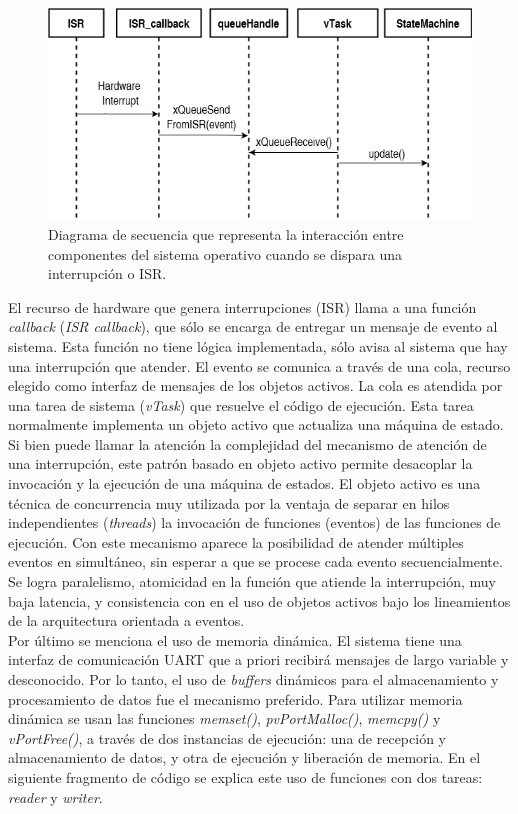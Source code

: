 \begin{figure}[ht]
	\centering
	\includegraphics[width=1\textwidth]{./Figures/ISRcallback.png}
	\caption{Diagrama de secuencia que representa la interacción entre componentes del sistema operativo cuando se dispara una interrupción o ISR.}
	\label{fig:ISR}
\end{figure}

El recurso de hardware que genera interrupciones (ISR) llama a una función \textit{callback} (\textit{ISR callback}), que sólo se encarga de entregar un mensaje de evento al sistema. Esta función no tiene lógica implementada, sólo avisa al sistema que hay una interrupción que atender. El evento se comunica a través de una cola, recurso elegido como interfaz de mensajes de los objetos activos. La cola es atendida por una tarea de sistema (\textit{vTask}) que resuelve el código de ejecución. Esta tarea normalmente implementa un objeto activo que actualiza una máquina de estado.\\

Si bien puede llamar la atención la complejidad del mecanismo de atención de una interrupción, este patrón basado en objeto activo permite desacoplar la invocación y la ejecución de una máquina de estados. El objeto activo es una técnica de concurrencia muy utilizada por la ventaja de separar en hilos independientes (\textit{threads}) la invocación de funciones (eventos) de las funciones de ejecución. Con este mecanismo aparece la posibilidad de atender múltiples eventos en simultáneo, sin esperar a que se procese cada evento secuencialmente. Se logra paralelismo, atomicidad en la función que atiende la interrupción, muy baja latencia, y consistencia con en el uso de objetos activos bajo los lineamientos de la arquitectura orientada a eventos.\\


Por último se menciona el uso de memoria dinámica. El sistema tiene una interfaz de comunicación UART que a priori recibirá mensajes de largo variable y desconocido. Por lo tanto, el uso de \textit{buffers} dinámicos para el almacenamiento y procesamiento de datos fue el mecanismo preferido. Para utilizar memoria dinámica se usan las funciones \textit{memset()}, \textit{pvPortMalloc()}, \textit{memcpy()} y \textit{vPortFree()}, a través de dos instancias de ejecución: una de recepción y almacenamiento de datos, y otra de ejecución y liberación de memoria. En el siguiente fragmento de código se explica este uso de funciones con dos tareas: \textit{reader} y \textit{writer}.


